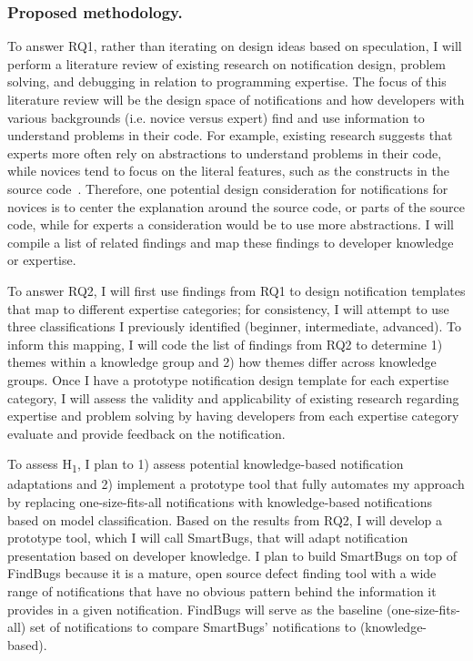 \documentclass{llncs}
\begin{document}
\subsubsection{Proposed methodology.}
To answer RQ1, rather than iterating on design ideas based on speculation, I will perform a literature review of existing research on notification design, problem solving, and debugging in relation to programming expertise. The focus of this literature review will be the design space of notifications and how developers with various backgrounds (i.e. novice versus expert) find and use information to understand problems in their code. For example, existing research suggests that experts more often rely on abstractions to understand problems in their code, while novices tend to focus on the literal features, such as the constructs in the source code~\cite{Weiser:1983:Representation}. Therefore, one potential design consideration for notifications for novices is to center the explanation around the source code, or parts of the source code, while for experts a consideration would be to use more abstractions. I will compile a list of related findings and map these findings to developer knowledge or expertise.

To answer RQ2, I will first use findings from RQ1 to design notification templates that map to different expertise categories; for consistency, I will attempt to use three classifications I previously identified (beginner, intermediate, advanced).
To inform this mapping, I will code the list of findings from RQ2 to determine 1) themes within a knowledge group and 2) how themes differ across knowledge groups.
Once I have a prototype notification design template for each expertise category, I will assess the validity and applicability of existing research regarding expertise and problem solving by having developers from each expertise category evaluate and provide feedback on the notification. 

 

To assess H\textsubscript{1}, I plan to 1) assess potential knowledge-based notification adaptations and 2) implement a prototype tool that fully automates my approach by replacing one-size-fits-all notifications with knowledge-based notifications based on model classification.
Based on the results from RQ2, I will develop a prototype tool, which I will call SmartBugs, that will adapt notification presentation based on developer knowledge. I plan to build SmartBugs on top of FindBugs because it is a mature, open source defect finding tool with a wide range of notifications that have no obvious pattern behind the information it provides in a given notification. FindBugs will serve as the baseline (one-size-fits-all) set of notifications to compare SmartBugs' notifications to (knowledge-based).
\end{document}
